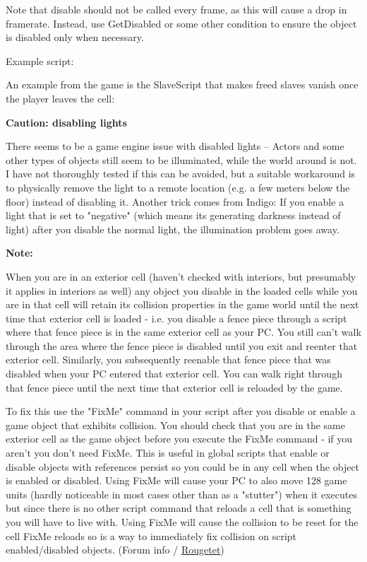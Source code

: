 Note that disable should not be called every frame, as this will cause a
drop in framerate. Instead, use GetDisabled or some other condition to
ensure the object is disabled only when necessary.

Example script:

An example from the game is the SlaveScript that makes freed slaves
vanish once the player leaves the cell:



\textbf{Caution: disabling lights}

There seems to be a game engine issue with disabled lights -- Actors and
some other types of objects still seem to be illuminated, while the
world around is not. I have not thoroughly tested if this can be
avoided, but a suitable workaround is to physically remove the light to
a remote location (e.g. a few meters below the floor) instead of
disabling it. Another trick comes from Indigo: If you enable a light
that is set to "negative" (which means its generating darkness instead
of light) after you disable the normal light, the illumination problem
goes away.

\textbf{Note:}

When you are in an exterior cell (haven't checked with interiors, but
presumably it applies in interiors as well) any object you disable in
the loaded cells while you are in that cell will retain its collision
properties in the game world until the next time that exterior cell is
loaded - i.e. you disable a fence piece through a script where that
fence piece is in the same exterior cell as your PC. You still can't
walk through the area where the fence piece is disabled until you exit
and reenter that exterior cell. Similarly, you subsequently reenable
that fence piece that was disabled when your PC entered that exterior
cell. You can walk right through that fence piece until the next time
that exterior cell is reloaded by the game.

To fix this use the "FixMe" command in your script after you disable or
enable a game object that exhibits collision. You should check that you
are in the same exterior cell as the game object before you execute the
FixMe command - if you aren't you don't need FixMe. This is useful in
global scripts that enable or disable objects with references persist so
you could be in any cell when the object is enabled or disabled. Using
FixMe will cause your PC to also move 128 game units (hardly noticeable
in most cases other than as a "stutter") when it executes but since
there is no other script command that reloads a cell that is something
you will have to live with. Using FixMe will cause the collision to be
reset for the cell FixMe reloads so is a way to immediately fix
collision on script enabled/disabled objects. (Forum info /
\href{http://www.bethsoft.com/bgsforums/index.php?showuser=370208}{Rougetet})

